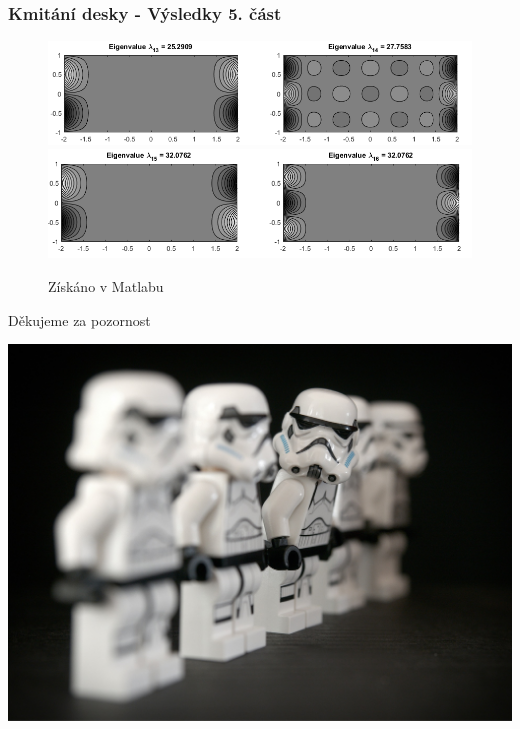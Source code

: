 \documentclass[xcolor=table]{beamer}
\begin{document}
\begin{frame}
\frametitle{Kmitání desky - Výsledky 5. část}
\centering
\begin{figure}
\includegraphics[width=1\linewidth]{obdelnicky7.png}
\includegraphics[width=1\linewidth]{obdelnicky8.png}
\caption{Získáno v Matlabu}
\end{figure}
\end{frame}

\begin{frame}
\begin{center}
\begin{huge}
Děkujeme za pozornost
\end{huge}
  \centering
  \includegraphics[width=.8\linewidth]{stormtroop.jpg}
\end{center}

\end{frame}
\end{document}
